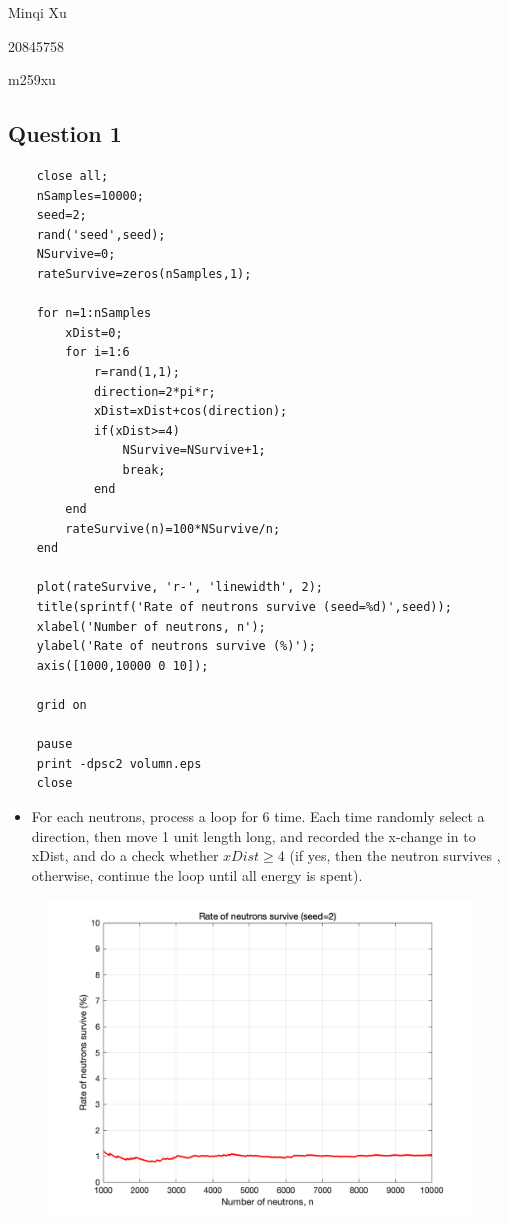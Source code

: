 \documentclass{article}
\begin{document}
Minqi Xu

20845758

m259xu

\subsection*{Question 1}

\begin{verbatim}
    close all;
    nSamples=10000;
    seed=2;
    rand('seed',seed);
    NSurvive=0;
    rateSurvive=zeros(nSamples,1);

    for n=1:nSamples
        xDist=0;
        for i=1:6
            r=rand(1,1);
            direction=2*pi*r;
            xDist=xDist+cos(direction);
            if(xDist>=4)
                NSurvive=NSurvive+1;
                break;
            end
        end
        rateSurvive(n)=100*NSurvive/n;
    end

    plot(rateSurvive, 'r-', 'linewidth', 2);
    title(sprintf('Rate of neutrons survive (seed=%d)',seed));
    xlabel('Number of neutrons, n');
    ylabel('Rate of neutrons survive (%)');
    axis([1000,10000 0 10]);

    grid on

    pause
    print -dpsc2 volumn.eps
    close
\end{verbatim}

\begin{itemize}
    \item For each neutrons, process a loop for 6 time. Each time randomly 
    select a direction, then move 1 unit length long, and recorded the x-change
    in to xDist, and do a check whether $xDist\geq4$ (if yes, then the neutron survives
    , otherwise, continue the loop until all energy is spent).
\end{itemize}

\begin{figure}
    \includegraphics[width=\linewidth]{img/q1.png}
\end{figure}
\end{document}
